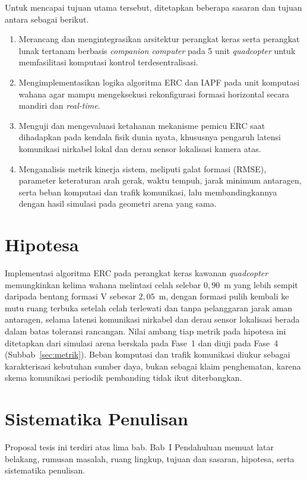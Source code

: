 \documentclass[12pt,a4paper]{report}
\begin{document}
Untuk mencapai tujuan utama tersebut, ditetapkan beberapa sasaran dan tujuan antara sebagai berikut.

\begin{enumerate}
    \item Merancang dan mengintegrasikan arsitektur perangkat keras serta perangkat lunak tertanam berbasis \textit{companion computer} pada 5 unit \textit{quadcopter} untuk memfasilitasi komputasi kontrol terdesentralisasi.
    \item Mengimplementasikan logika algoritma ERC dan IAPF pada unit komputasi wahana agar mampu mengeksekusi rekonfigurasi formasi horizontal secara mandiri dan \textit{real-time}.
    \item Menguji dan mengevaluasi ketahanan mekanisme pemicu ERC saat dihadapkan pada kendala fisik dunia nyata, khususnya pengaruh latensi komunikasi nirkabel lokal dan derau sensor lokalisasi kamera atas.
    \item Menganalisis metrik kinerja sistem, meliputi galat formasi (RMSE), parameter keteraturan arah gerak, waktu tempuh, jarak minimum antaragen, serta beban komputasi dan trafik komunikasi, lalu membandingkannya dengan hasil simulasi pada geometri arena yang sama.
\end{enumerate}

\section{Hipotesa}
Implementasi algoritma ERC pada perangkat keras kawanan \textit{quadcopter} memungkinkan kelima wahana melintasi celah selebar $0{,}90$~m yang lebih sempit daripada bentang formasi V sebesar $2{,}05$~m, dengan formasi pulih kembali ke mutu ruang terbuka setelah celah terlewati dan tanpa pelanggaran jarak aman antaragen, selama latensi komunikasi nirkabel dan derau sensor lokalisasi berada dalam batas toleransi rancangan. Nilai ambang tiap metrik pada hipotesa ini ditetapkan dari simulasi arena berskala pada Fase~1 dan diuji pada Fase~4 (Subbab~\ref{sec:metrik}). Beban komputasi dan trafik komunikasi diukur sebagai karakterisasi kebutuhan sumber daya, bukan sebagai klaim penghematan, karena skema komunikasi periodik pembanding tidak ikut diterbangkan.

\section{Sistematika Penulisan}
Proposal tesis ini terdiri atas lima bab. Bab~I Pendahuluan memuat latar belakang, rumusan masalah, ruang lingkup, tujuan dan sasaran, hipotesa, serta sistematika penulisan.
\end{document}
